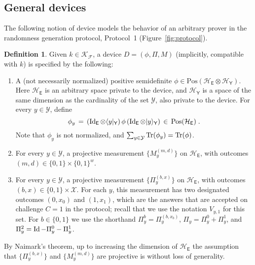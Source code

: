 \documentclass[11pt]{article}
\theoremstyle{remark}
\theoremstyle{definition}
\newtheorem{definition}[theorem]{Definition}
\newcommand{\ket}[1]{|#1\rangle}
\newcommand{\bra}[1]{\langle#1|}
\newcommand{\Tr}{\mbox{\rm Tr}}
\newcommand{\Id}{\ensuremath{\mathop{\rm Id}\nolimits}}
\newcommand{\reg}[1]{{\textsf{#1}}}
\newcommand{\mF}{\ensuremath{\mathcal{F}}}
\newcommand{\mK}{\ensuremath{\mathcal{K}}}
\newcommand{\mX}{\ensuremath{\mathcal{X}}}
\newcommand{\mY}{\ensuremath{\mathcal{Y}}}
\newcommand{\mH}{\mathcal{H}}
\newcommand{\setft}[1]{\mathrm{#1}}
\newcommand{\Pos}{\setft{Pos}}
\begin{document}
\subsection{General devices}
\label{sec:devices}

The following notion of device models the behavior of an arbitrary prover in the randomness generation protocol, Protocol~1 (Figure~\ref{fig:protocol}). 

\begin{definition}\label{def:device}
Given $k\in \mK_\mF$, a device $D = (\phi,\Pi,M)$ (implicitly, compatible with $k$) is specified by the following:
\begin{enumerate}
\item A (not necessarily normalized) positive semidefinite $\phi \in \Pos(\mH_\reg{E}\otimes \mH_\reg{Y})$. Here $\mH_\reg{E}$ is an arbitrary space private to the device, and $\mH_{\reg{Y}}$ is a space of the same dimension as the cardinality of the set $\mY$, also private to the device. 
 For every $y\in\mY$, define
$$\phi_y \,=\, (\Id_{\reg{E}} \otimes \bra{y}_\reg{Y})\,\phi\,(\Id_{\reg{E}} \otimes \ket{y}_\reg{Y})\,\in\,\Pos(\mH_\reg{E})\;.$$
Note that $\phi_y$ is not normalized, and $\sum_{y\in\mY} \Tr(\phi_y)=\Tr(\phi)$. 
\item For every $y\in\mY$, a projective measurement $\{M_y^{(m,d)}\}$ on $\mH_\reg{E}$, with outcomes $(m,d)\in \{0,1\}\times \{0,1\}^w$. 
\item For every $y\in\mY$, a projective measurement $\{\Pi_y^{(b,x)}\}$ on $\mH_\reg{E}$, with outcomes $(b,x)\in \{0,1\}\times\mX$. For each $y$, this measurement has two designated outcomes $(0,x_0)$ and $(1,x_1)$, which are the answers that are accepted on challenge $C=1$ in the protocol; recall that we use the notation $V_{y,1}$ for this set. For $b\in\{0,1\}$ we use the shorthand $\Pi_y^b = \Pi_y^{(b,x_b)}$, $\Pi_y= \Pi_y^0+\Pi_y^1$, and $\Pi_y^2 = \Id - \Pi_y^0-\Pi_y^1$.
\end{enumerate}
\end{definition}

By Naimark's theorem, up to increasing the dimension of $\mH_\reg{E}$ the assumption that $\{\Pi_y^{(b,x)}\}$ and $\{M_y^{(m,d)}\}$ are projective is without loss of generality. 
\end{document}

